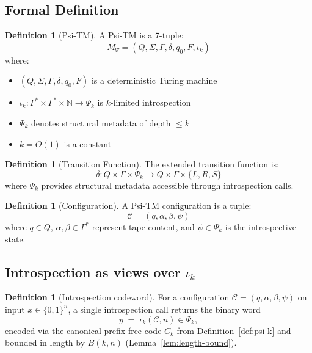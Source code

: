 \documentclass[11pt]{article}
\theoremstyle{definition}
\newtheorem{definition}[theorem]{Definition}
\newcommand{\bits}{\{0,1\}}
\begin{document}
\subsection{Formal Definition}

\begin{definition}[Psi-TM]
A Psi-TM is a 7-tuple:
$$M_\Psi = (Q, \Sigma, \Gamma, \delta, q_0, F, \iota_k)$$
where:
\begin{itemize}
\item $(Q, \Sigma, \Gamma, \delta, q_0, F)$ is a deterministic Turing machine
\item $\iota_k: \Gamma^* \times \Gamma^* \times \mathbb{N} \to \Psi_k$ is $k$-limited introspection
\item $\Psi_k$ denotes structural metadata of depth $\leq k$
\item $k = O(1)$ is a constant
\end{itemize}
\end{definition}

\begin{definition}[Transition Function]
The extended transition function is:
$$\delta: Q \times \Gamma \times \Psi_k \to Q \times \Gamma \times \{L, R, S\}$$
where $\Psi_k$ provides structural metadata accessible through introspection calls.
\end{definition}

\begin{definition}[Configuration]
A Psi-TM configuration is a tuple:
$$\mathcal{C} = (q, \alpha, \beta, \psi)$$
where $q \in Q$, $\alpha, \beta \in \Gamma^*$ represent tape content, and $\psi \in \Psi_k$ is the introspective state.
\end{definition}

\subsection{Introspection as views over $\iota_k$}

\begin{definition}[Introspection codeword]
For a configuration $\mathcal{C}=(q,\alpha,\beta,\psi)$ on input $x\in\bits^n$, a single introspection call returns the binary word
\[
y \;=\; \iota_k(\mathcal{C},n)\in\Psi_k,
\]
encoded via the canonical prefix-free code $C_k$ from Definition~\ref{def:psi-k} and bounded in length by $B(k,n)$ (Lemma~\ref{lem:length-bound}).
\end{definition}
\end{document}
